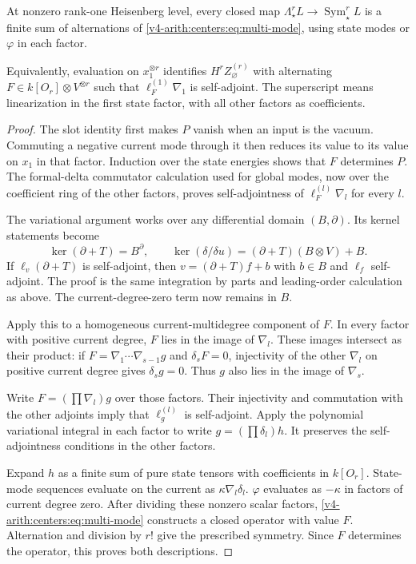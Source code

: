 \begin{theorem}\label{v4-arith:centers:thm:top-classification}
At nonzero rank-one
Heisenberg level, every
closed map
$\Lambda^r_\star L\to
\operatorname{Sym}^r_\star L$
is a finite sum of
alternations of
\eqref{v4-arith:centers:eq:multi-mode},
using state modes or
$\varphi$ in each
factor.

Equivalently, evaluation
on $x_1^{\otimes r}$
identifies
$H^rZ_\varnothing^{(r)}$
with alternating
$F\in k[O_r]\otimes V^{\otimes r}$
such that
$\ell_F^{(1)}\nabla_1$
is self-adjoint.
The superscript means
linearization in the
first state factor,
with all other factors
as coefficients.
\end{theorem}

\begin{proof}
The slot identity
first makes $P$ vanish
when an input is the
vacuum. Commuting a
negative current mode
through it then reduces
its value to its value
on $x_1$ in that
factor. Induction over
the state energies
shows that $F$ determines
$P$. The formal-delta
commutator calculation
used for global modes,
now over the coefficient
ring of the other
factors, proves
self-adjointness of
$\ell_F^{(l)}\nabla_l$
for every $l$.

The variational argument
works over any differential
domain $(B,\partial)$.
Its kernel statements
become
\[
 \ker(\partial+T)=B^\partial,\qquad
 \ker(\delta/\delta u)
 =(\partial+T)(B\otimes V)+B.
\]
If $\ell_v(\partial+T)$
is self-adjoint, then
$v=(\partial+T)f+b$
with $b\in B$ and
$\ell_f$ self-adjoint.
The proof is the
same integration by
parts and leading-order
calculation as above.
The current-degree-zero
term now remains in
$B$.

Apply this to a homogeneous
current-multidegree
component of $F$.
In every factor with
positive current degree,
$F$ lies in the image
of $\nabla_l$.
These images intersect
as their product:
if
$F=\nabla_1\cdots\nabla_{s-1}g$
and $\delta_sF=0$,
injectivity of the
other $\nabla_l$ on
positive current degree
gives $\delta_sg=0$.
Thus $g$ also lies
in the image of
$\nabla_s$.

Write
$F=(\prod\nabla_l)g$
over those factors.
Their injectivity and
commutation with the
other adjoints imply
that $\ell_g^{(l)}$
is self-adjoint.
Apply the polynomial
variational integral
in each factor to
write
$g=(\prod\delta_l)h$.
It preserves the
self-adjointness conditions
in the other factors.

Expand $h$ as a finite
sum of pure state
tensors with coefficients
in $k[O_r]$.
State-mode sequences
evaluate on the current
as $\kappa\nabla_l\delta_l$.
$\varphi$ evaluates as
$-\kappa$ in factors
of current degree zero.
After dividing these
nonzero scalar factors,
\eqref{v4-arith:centers:eq:multi-mode}
constructs a closed
operator with value
$F$. Alternation and
division by $r!$
give the prescribed
symmetry. Since $F$
determines the operator,
this proves both
descriptions.
\end{proof}

